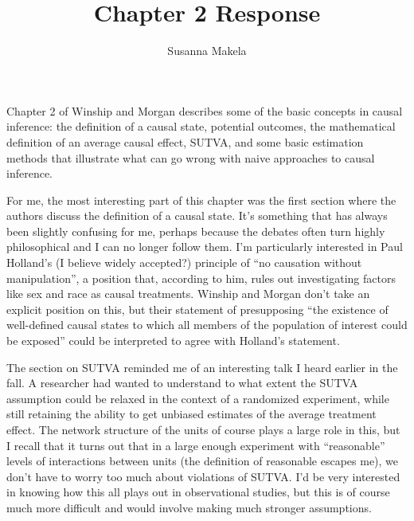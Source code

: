 \documentclass[10pt,a4paper]{article}
\author{Susanna Makela}
\title{Chapter 2 Response}
\begin{document}
\maketitle

Chapter 2 of Winship and Morgan describes some of the basic concepts in causal inference: the definition of a causal state, potential outcomes, the mathematical definition of an average causal effect, SUTVA, and some basic estimation methods that illustrate what can go wrong with naive approaches to causal inference.

For me, the most interesting part of this chapter was the first section where the authors discuss the definition of a causal state. It's something that has always been slightly confusing for me, perhaps because the debates often turn highly philosophical and I can no longer follow them. I'm particularly interested in Paul Holland's (I believe widely accepted?) principle of ``no causation without manipulation'', a position that, according to him, rules out investigating factors like sex and race as causal treatments. Winship and Morgan don't take an explicit position on this, but their statement of presupposing ``the existence of well-defined causal states to which all members of the population of interest could be exposed'' could be interpreted to agree with Holland's statement.

The section on SUTVA reminded me of an interesting talk I heard earlier in the fall. A researcher had wanted to understand to what extent the SUTVA assumption could be relaxed in the context of a randomized experiment, while still retaining the ability to get unbiased estimates of the average treatment effect. The network structure of the units of course plays a large role in this, but I recall that it turns out that in a large enough experiment with ``reasonable'' levels of interactions between units (the definition of reasonable escapes me), we don't have to worry too much about violations of SUTVA. I'd be very interested in knowing how this all plays out in observational studies, but this is of course much more difficult and would involve making much stronger assumptions.
\end{document}
